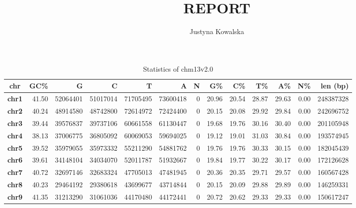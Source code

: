 \documentclass[a4paper,10pt]{article}
\title{\Huge\textbf{REPORT}}
\author{\huge Justyna Kowalska}
\begin{document}
\maketitle

\begin{table}[h]
\caption{\large{Statistics of chm13v2.0}}
\begin{tabularx}{\textwidth}{c|rrrrrrrrrrrr}
\toprule
\textbf{chr}   & \textbf{GC\%} & \textbf{G} & \textbf{C} & \textbf{T} & \textbf{A} & \textbf{N} & \textbf{G\%} & \textbf{C\%} & \textbf{T\%} & \textbf{A\%} & \textbf{N\%} & \textbf{len (bp)} \\ \midrule
\textbf{chr1}  & 41.50         & 52064401   & 51017014   & 71705495   & 73600418   & 0          & 20.96        & 20.54        & 28.87        & 29.63        & 0.00         & 248387328         \\
\textbf{chr2}  & 40.24         & 48914580   & 48742800   & 72614972   & 72424400   & 0          & 20.15        & 20.08        & 29.92        & 29.84        & 0.00         & 242696752         \\
\textbf{chr3}  & 39.44         & 39576837   & 39737106   & 60661558   & 61130447   & 0          & 19.68        & 19.76        & 30.16        & 30.40        & 0.00         & 201105948         \\
\textbf{chr4}  & 38.13         & 37006775   & 36805092   & 60069053   & 59694025   & 0          & 19.12        & 19.01        & 31.03        & 30.84        & 0.00         & 193574945         \\
\textbf{chr5}  & 39.52         & 35979055   & 35973332   & 55211290   & 54881762   & 0          & 19.76        & 19.76        & 30.33        & 30.15        & 0.00         & 182045439         \\
\textbf{chr6}  & 39.61         & 34148104   & 34034070   & 52011787   & 51932667   & 0          & 19.84        & 19.77        & 30.22        & 30.17        & 0.00         & 172126628         \\
\textbf{chr7}  & 40.72         & 32697146   & 32683324   & 47705013   & 47481945   & 0          & 20.36        & 20.35        & 29.71        & 29.57        & 0.00         & 160567428         \\
\textbf{chr8}  & 40.23         & 29464192   & 29380618   & 43699677   & 43714844   & 0          & 20.15        & 20.09        & 29.88        & 29.89        & 0.00         & 146259331         \\
\textbf{chr9}  & 41.35         & 31213290   & 31061036   & 44170480   & 44172441   & 0          & 20.72        & 20.62        & 29.33        & 29.33        & 0.00         & 150617247         \\

\end{tabularx}
\end{table}
\end{document}
